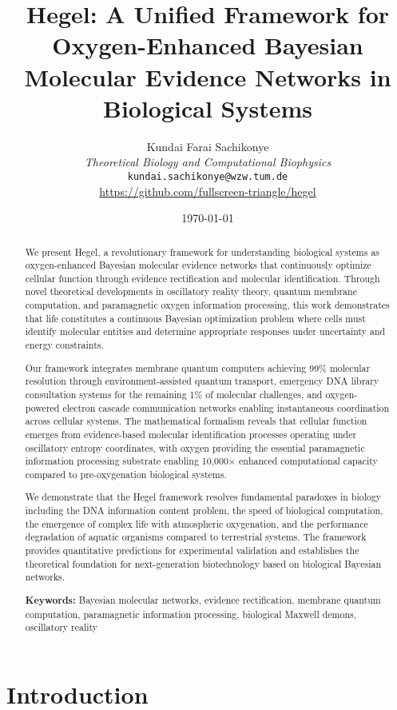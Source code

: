 \documentclass[12pt,a4paper]{article}
\title{\textbf{Hegel: A Unified Framework for Oxygen-Enhanced Bayesian Molecular Evidence Networks in Biological Systems}}
\author{
Kundai Farai Sachikonye\\
\textit{Theoretical Biology and Computational Biophysics}\\
\texttt{kundai.sachikonye@wzw.tum.de}\\
\url{https://github.com/fullscreen-triangle/hegel}
}
\date{\today}
\begin{document}
\maketitle

\begin{abstract}
We present Hegel, a revolutionary framework for understanding biological systems as oxygen-enhanced Bayesian molecular evidence networks that continuously optimize cellular function through evidence rectification and molecular identification. Through novel theoretical developments in oscillatory reality theory, quantum membrane computation, and paramagnetic oxygen information processing, this work demonstrates that life constitutes a continuous Bayesian optimization problem where cells must identify molecular entities and determine appropriate responses under uncertainty and energy constraints.

Our framework integrates membrane quantum computers achieving 99\% molecular resolution through environment-assisted quantum transport, emergency DNA library consultation systems for the remaining 1\% of molecular challenges, and oxygen-powered electron cascade communication networks enabling instantaneous coordination across cellular systems. The mathematical formalism reveals that cellular function emerges from evidence-based molecular identification processes operating under oscillatory entropy coordinates, with oxygen providing the essential paramagnetic information processing substrate enabling 10,000× enhanced computational capacity compared to pre-oxygenation biological systems.

We demonstrate that the Hegel framework resolves fundamental paradoxes in biology including the DNA information content problem, the speed of biological computation, the emergence of complex life with atmospheric oxygenation, and the performance degradation of aquatic organisms compared to terrestrial systems. The framework provides quantitative predictions for experimental validation and establishes the theoretical foundation for next-generation biotechnology based on biological Bayesian networks.

\textbf{Keywords:} Bayesian molecular networks, evidence rectification, membrane quantum computation, paramagnetic information processing, biological Maxwell demons, oscillatory reality
\end{abstract}

\section{Introduction}
\end{document}
